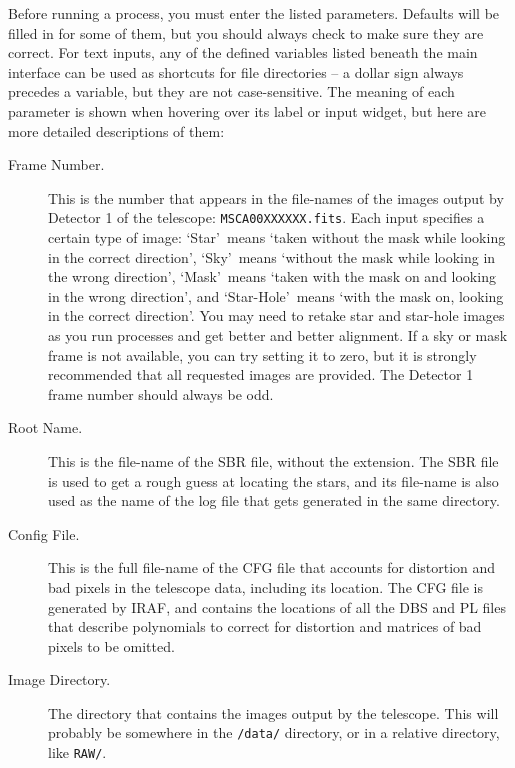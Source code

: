 \documentclass[10pt]{article}
\begin{document}
Before running a process, you must enter the listed parameters. Defaults will be filled in for some of them, but you should always check to make sure they are correct. For text inputs, any of the defined variables listed beneath the main interface can be used as shortcuts for file directories -- a dollar sign always precedes a variable, but they are not case-sensitive. The meaning of each parameter is shown when hovering over its label or input widget, but here are more detailed descriptions of them:

\begin{description}

    \item[Frame Number.] This is the number that appears in the file-names of the images output by Detector 1 of the telescope: \texttt{MSCA00XXXXXX.fits}. Each input specifies a certain type of image: \lq Star\rq\ means \lq taken without the mask while looking in the correct direction\rq, \lq Sky\rq\ means \lq without the mask while looking in the wrong direction\rq, \lq Mask\rq\ means \lq taken with the mask on and looking in the wrong direction\rq, and \lq Star-Hole\rq\ means \lq with the mask on, looking in the correct direction\rq. You may need to retake star and star-hole images as you run processes and get better and better alignment. If a sky or mask frame is not available, you can try setting it to zero, but it is strongly recommended that all requested images are provided. The Detector 1 frame number should always be odd.
    
    \item[Root Name.] This is the file-name of the SBR file, without the extension. The SBR file is used to get a rough guess at locating the stars, and its file-name is also used as the name of the log file that gets generated in the same directory.
    
    \item[Config File.] This is the full file-name of the CFG file that accounts for distortion and bad pixels in the telescope data, including its location. The CFG file is generated by IRAF, and contains the locations of all the DBS and PL files that describe polynomials to correct for distortion and matrices of bad pixels to be omitted.
    
    \item[Image Directory.] The directory that contains the images output by the telescope. This will probably be somewhere in the \texttt{/data/} directory, or in a relative directory, like \texttt{RAW/}.
    

\end{description}
\end{document}
